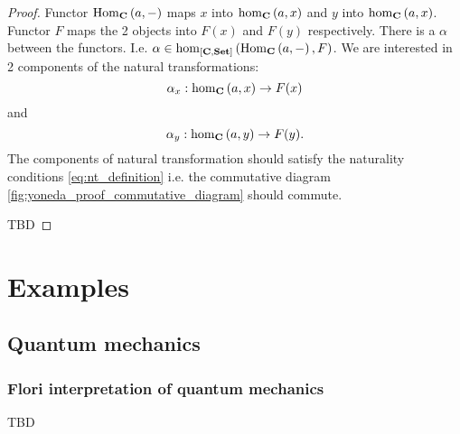 \begin{lemma}[Yoneda]
\begin{proof}
Functor
$\mathrm{Hom}_{\mathbf{C}}\left(a, -\right)$ maps $x$ into $\catmset[C]{a}{x}$ and $y$ into 
$\catmset[C]{a}{x}$. Functor $F$ maps the 2 objects into $F(x)$ and
$F(y)$ respectively. There is a  $\alpha$ between
the functors. I.e.  $\alpha \in
\catmset[\funcat{C}{Set}]{\catcovhom{C}{a}}{F}$. We are interested in
2 components of the natural transformations:
\[
\alpha_x : \catmset[C]{a}{x} \to F(x)
\]
and
\[
\alpha_y : \catmset[C]{a}{y} \to F(y).
\]
The components of natural transformation should satisfy the naturality
conditions \eqref{eq:nt_definition} i.e. the commutative diagram
\cref{fig:yoneda_proof_commutative_diagram} should commute.

TBD
\end{proof}
\end{lemma}

\section{Examples}

\subsection{Quantum mechanics}

\subsubsection{Flori interpretation of quantum mechanics}
TBD
